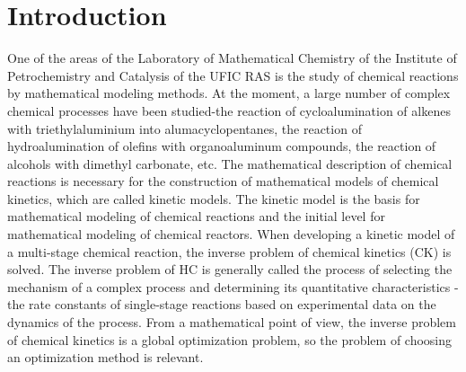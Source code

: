 \documentclass{svproc}
\begin{document}
\section{Introduction}


One of the areas of the Laboratory of Mathematical Chemistry of the Institute of Petrochemistry and Catalysis of the UFIC RAS is the study of chemical reactions by mathematical modeling methods. At the moment, a large number of complex chemical processes have been studied-the reaction of cycloalumination of alkenes with triethylaluminium into alumacyclopentanes, the reaction of hydroalumination of olefins with organoaluminum compounds, the reaction of alcohols with dimethyl carbonate, etc. The mathematical description of chemical reactions is necessary for the construction of mathematical models of chemical kinetics, which are called kinetic models. The kinetic model is the basis for mathematical modeling of chemical reactions and the initial level for mathematical modeling of chemical reactors. When developing a kinetic model of a multi-stage chemical reaction, the inverse problem of chemical kinetics (CK) is solved. The inverse problem of HC is generally called the process of selecting the mechanism of a complex process and determining its quantitative characteristics - the rate constants of single-stage reactions based on experimental data on the dynamics of the process. From a mathematical point of view, the inverse problem of chemical kinetics is a global optimization problem, so the problem of choosing an optimization method is relevant.
\end{document}
